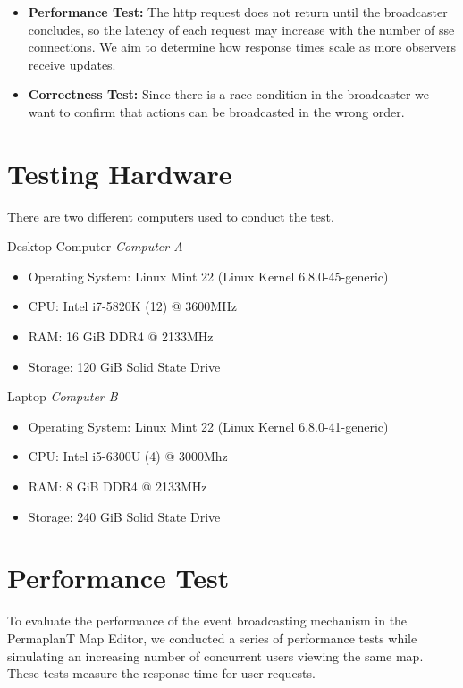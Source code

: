 \documentclass[final,oneside]{vutinfth}
\begin{document}
\begin{itemize}
    \item \textbf{Performance Test:} The \gls{http} request does not return until the broadcaster concludes, so the latency of each request may increase with the number of \gls{sse} connections.
    We aim to determine how response times scale as more observers receive updates.
    \item \textbf{Correctness Test:} Since there is a race condition in the broadcaster we want to confirm that actions can be broadcasted in the wrong order. 
\end{itemize}

\section{Testing Hardware}

There are two different computers used to conduct the test.

Desktop Computer \textit{Computer A}
\begin{itemize}
  \item Operating System: Linux Mint 22 (Linux Kernel 6.8.0-45-generic)
  \item CPU: Intel i7-5820K (12) @ 3600MHz
  \item RAM: 16 GiB DDR4 @ 2133MHz
  \item Storage: 120 GiB Solid State Drive
\end{itemize}

Laptop \textit{Computer B}
\begin{itemize}
  \item Operating System: Linux Mint 22 (Linux Kernel 6.8.0-41-generic)
  \item CPU: Intel i5-6300U (4) @ 3000Mhz
  \item RAM: 8 GiB DDR4 @ 2133MHz
  \item Storage: 240 GiB Solid State Drive
\end{itemize}

\section{Performance Test}

To evaluate the performance of the event broadcasting mechanism in the PermaplanT Map Editor, we conducted a series of performance tests while simulating an increasing number of concurrent users viewing the same map.
These tests measure the response time for user requests.
\end{document}
